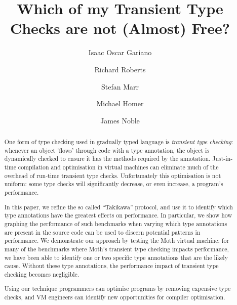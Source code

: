 \documentclass[sigplan,screen]{acmart}
\begin{document}
\title{Which of my Transient Type Checks are not (Almost) Free?}

\author{Isaac Oscar Gariano}

\author{Richard Roberts}


\author{Stefan Marr}


\author{Michael Homer}



\author{James Noble}




\begin{abstract}
One form of type checking used in gradually typed language is
\emph{transient type checking}: whenever an object `flows' through
code with a type annotation, the object is dynamically checked to
ensure it has the methods required by the annotation. 
Just-in-time compilation and optimisation in virtual machines can eliminate much of the overhead of run-time transient type checks. 
Unfortunately this optimisation is not uniform: some type checks will significantly decrease, or even increase, a program's performance.

In this paper, we refine the so called ``Takikawa'' protocol, and use it to identify which type annotations have the greatest effects on performance. In particular, we show how graphing the performance of such benchmarks when varying which type annotations are present in the source code can be used to discern potential patterns in performance. We demonstrate our approach by testing the Moth virtual machine: for many of the benchmarks where Moth's transient type checking impacts performance, we have been able to identify one or two specific type annotations that are the likely cause. Without these type annotations, the performance impact of transient type checking becomes negligible.

Using our technique programmers can optimise programs by removing expensive type checks, and VM engineers can identify new opportunities for compiler optimisation.\pagebreak
\end{abstract}
\end{document}

